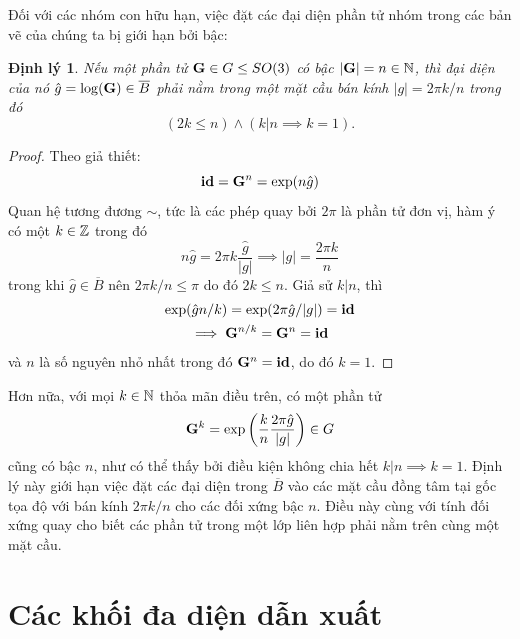 \documentclass{article}
\theoremstyle{plain}
\newtheorem{theorem}{Định lý}
\theoremstyle{definition}
\begin{document}
    Đối với các nhóm con hữu hạn, việc đặt các đại diện phần tử nhóm trong các bản vẽ của chúng ta bị giới hạn bởi bậc: 
    \begin{theorem}\label{thm:sphereclass}
        Nếu một phần tử $\mathbf{G}\in G\leq SO(3)$ có bậc $\left|\mathbf{G}\right|=n\in\mathbb{N}$, thì đại diện của nó $\hat{g}=\log(\mathbf{G})\in \overline{B}$ phải nằm trong một mặt cầu bán kính $|g|=2\pi k/n$ trong đó 
        \begin{equation*}
            (2k\leq n)\land (k|n\implies k=1).
        \end{equation*}
    \end{theorem}
    \begin{proof}
    Theo giả thiết: 
    \begin{equation}
        \mathbf{id} = \mathbf{G}^n = \exp(n\hat{g})
    \end{equation}
    Quan hệ tương đương $\sim$, tức là các phép quay bởi $2\pi$ là phần tử đơn vị, hàm ý có một $k\in\mathbb{Z}$ trong đó
    \begin{equation}
        n\hat{g}=2\pi k\frac{\hat{g}}{|g|}\implies |g|=\frac{2\pi k}{n}
    \end{equation}
    trong khi $\hat{g}\in \overline{B}$ nên $2\pi k/n\leq \pi$ do đó $2k\leq n$. Giả sử $k|n$, thì
    \begin{gather}
        \exp(\hat{g}n/k)=\exp(2\pi \hat{g}/|g|)=\mathbf{id}\\
        \implies\mathbf{G}^{n/k}=\mathbf{G}^n=\mathbf{id}
    \end{gather} và $n$ là số nguyên nhỏ nhất trong đó $\mathbf{G}^n=\mathbf{id}$, do đó $k = 1$.
    \end{proof}
    Hơn nữa, với mọi $k\in \mathbb{N}$ thỏa mãn điều trên, có một phần tử
        \begin{equation*}
            \mathbf{G}^k=\exp\left(\frac{k}{n}\frac{2\pi \hat{g}}{\left|g\right|}\right)\in G
        \end{equation*}
    cũng có bậc $n$, như có thể thấy bởi điều kiện không chia hết $k|n\implies k=1$. 
    Định lý này giới hạn việc đặt các đại diện trong $\overline{B}$ vào các mặt cầu đồng tâm tại gốc tọa độ với bán kính $2\pi k/n$ cho các đối xứng bậc $n$. Điều này cùng với tính đối xứng quay cho biết các phần tử trong một lớp liên hợp phải nằm trên cùng một mặt cầu. 
    
\section{Các khối đa diện dẫn xuất}
\end{document}
